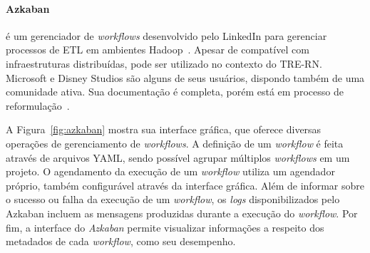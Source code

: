 





\paragraph{Azkaban}
é um gerenciador de \textit{workflows} desenvolvido pelo LinkedIn para gerenciar processos de ETL em ambientes Hadoop~\cite{}. Apesar de compatível com infraestruturas distribuídas, pode ser utilizado no contexto do TRE-RN. Microsoft e Disney Studios são alguns de seus usuários, dispondo também de uma comunidade ativa. Sua documentação é completa, porém está em processo de reformulação~\cite{azakbandocsnew}.

A Figura~\ref{fig:azkaban} mostra sua interface gráfica, que oferece diversas operações de gerenciamento de \textit{workflows}. A definição de um \textit{workflow} é feita através de arquivos YAML, sendo 
possível agrupar múltiplos \textit{workflows} em um projeto. O agendamento da execução de um \textit{workflow} utiliza um agendador próprio, também configurável através da interface gráfica. Além de informar sobre o sucesso ou falha da execução de um \textit{workflow}, os \textit{logs} disponibilizados pelo Azkaban incluem as mensagens produzidas durante a execução do \textit{workflow}.
Por fim, a interface do \textit{Azkaban} permite visualizar informações a respeito dos metadados de cada \textit{workflow}, como seu desempenho. 

